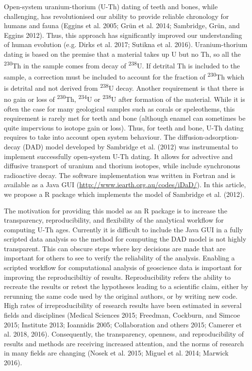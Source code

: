 \documentclass[]{elsarticle} %
\begin{document}
Open-system uranium-thorium (U-Th) dating of teeth and bones, while challenging, has revolutionised our ability to provide reliable chronology for humans and fauna (Eggins et al. 2005; Grün et al. 2014; Sambridge, Grün, and Eggins 2012). Thus, this approach has significantly improved our understanding of human evolution (e.g. Dirks et al. 2017; Sutikna et al. 2016). Uranium-thorium dating is based on the premise that a material takes up U but no Th, so all the \textsuperscript{230}Th in the sample comes from decay of \textsuperscript{238}U. If detrital Th is included to the sample, a correction must be included to account for the fraction of \textsuperscript{230}Th which is detrital and not derived from \textsuperscript{238}U decay. Another requirement is that there is no gain or loss of \textsuperscript{230}Th, \textsuperscript{234}U or \textsuperscript{238}U after formation of the material. While it is often the case for many geological samples such as corals or speleothems, this requirement is rarely met for teeth and bone (although enamel can sometimes be quite impervious to isotope gain or loss). Thus, for teeth and bone, U-Th dating requires to take into account open system behaviour. The diffusion-adsorption-decay (DAD) model developed by Sambridge et al. (2012) was instrumental to implement successfully open-system U-Th dating. It allows for advective and diffusive transport of uranium and thorium isotopes, while include synchronous radioactive decay. The software implementation was written in Fortran and is available as a Java GUI (\url{http://www.iearth.org.au/codes/iDaD/}). In this article, we propose a R package which implements the model of Sambridge et al. (2012).

The motivation for providing this model as an R package is to increase the transparency, reproducibility, and flexibility of the analytical workflow for computing U-Th ages. Currently it is difficult to include the Java GUI in a fully scripted data analysis so the method for computing the DAD model is not highly transparent. This can obscure steps where key decisions are made that are important for others to see to verify the reliability of the analysis. Enabling a scripted workflow for computational analysis of geoscience data is important for improving the reproducibiltiy of results. Reproducibility refers the ability to recreate the results or retest the hypotheses leading to a scientific claim, either by rerunning the same code used by the original authors, or by writing new code. High rates of irreproducibility of research results have been estimated in several fields and disciplines (Medical Sciences 2015; Freedman, Cockburn, and Simcoe 2015; Institute 2013; Ioannidis 2005; Collaboration and others 2015; Camerer et al. 2018, 2016). Consequently, the transparency, openness, and reproducibility of results and methods are receiving increased attention, and the norms of research in many fields are changing (Nosek et al. 2015; Miguel et al. 2014; Marwick 2016).
\end{document}
